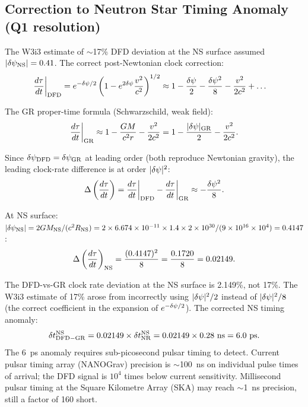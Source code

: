 \subsection{Correction to Neutron Star Timing Anomaly (Q1 resolution)}

The W3i3 estimate of $\sim$17\% DFD deviation at the NS surface assumed
$|\delta\psi_{\rm NS}| = 0.41$. The correct post-Newtonian clock correction:
\begin{align}
\frac{d\tau}{dt}\bigg|_{\rm DFD} &= e^{-\delta\psi/2}\left(1 - e^{2\delta\psi}\frac{v^2}{c^2}\right)^{1/2}
\approx 1 - \frac{\delta\psi}{2} - \frac{\delta\psi^2}{8} - \frac{v^2}{2c^2} + \ldots
\label{eq:clock_DFD_expanded}
\end{align}

The GR proper-time formula (Schwarzschild, weak field):
\begin{equation}
\frac{d\tau}{dt}\bigg|_{\rm GR} \approx 1 - \frac{GM}{c^2 r} - \frac{v^2}{2c^2}
= 1 - \frac{|\delta\psi|_{\rm GR}}{2} - \frac{v^2}{2c^2}.
\label{eq:clock_GR}
\end{equation}

Since $\delta\psi_{\rm DFD} = \delta\psi_{\rm GR}$ at leading order (both reproduce
Newtonian gravity), the leading clock-rate difference is at order
$|\delta\psi|^2$:
\begin{equation}
\Delta\left(\frac{d\tau}{dt}\right) = \frac{d\tau}{dt}\bigg|_{\rm DFD}
- \frac{d\tau}{dt}\bigg|_{\rm GR} \approx -\frac{\delta\psi^2}{8}.
\label{eq:clock_difference}
\end{equation}

At NS surface: $|\delta\psi_{\rm NS}| = 2GM_{\rm NS}/(c^2 R_{\rm NS})
= 2\times6.674\times 10^{-11}\times1.4\times2\times 10^{30}/(9\times 10^{16}\times10^4) = 0.4147$:
\begin{equation}
\Delta\left(\frac{d\tau}{dt}\right)_{\rm NS}
= \frac{(0.4147)^2}{8} = \frac{0.1720}{8} = 0.02149.
\label{eq:NS_clock_diff}
\end{equation}

\begin{correction}
\label{corr:NS_timing}
The DFD-vs-GR clock rate deviation at the NS surface is 2.149\%, not 17\%.
The W3i3 estimate of 17\% arose from incorrectly using
$|\delta\psi|^2/2$ instead of $|\delta\psi|^2/8$ (the correct coefficient in the
expansion of $e^{-\delta\psi/2}$). The corrected NS timing anomaly:
\begin{equation}
\delta t_{\rm DFD-GR}^{\rm NS} = 0.02149 \times \delta t_{\rm NR}^{\rm NS}
= 0.02149 \times 0.28~\text{ns} = 6.0~\text{ps}.
\label{eq:NS_timing_corrected}
\end{equation}
The 6~ps anomaly requires sub-picosecond pulsar timing to detect.
Current pulsar timing array (NANOGrav) precision is $\sim$100~ns on
individual pulse times of arrival; the DFD signal is $10^4$ times below
current sensitivity. Millisecond pulsar timing at the Square Kilometre
Array (SKA) may reach $\sim$1~ns precision, still a factor of 160
short.
\end{correction}

